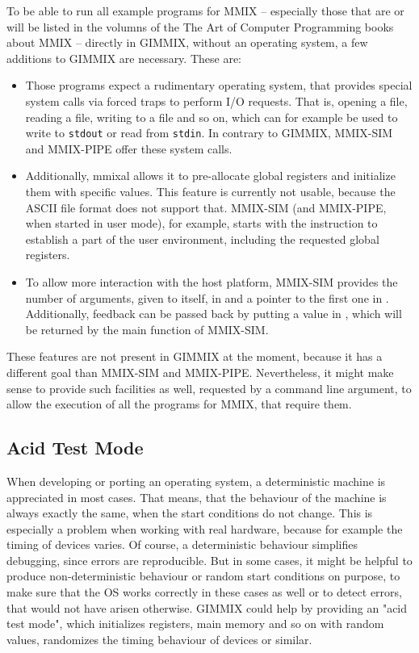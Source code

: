 To be able to run all example programs for MMIX -- especially those that are or will be listed in the volumns of the \gls{The Art of Computer Programming} books about MMIX  -- directly in GIMMIX, \ie without an operating system, a few additions to GIMMIX are necessary. These are:
\begin{itemize}
	\item Those programs expect a rudimentary operating system, that provides special system calls via forced traps to perform I/O requests. That is, opening a file, reading a file, writing to a file and so on, which can for example be used to write to {\tt stdout} or read from {\tt stdin}. In contrary to GIMMIX, MMIX-SIM and MMIX-PIPE offer these system calls.
	\item Additionally, mmixal allows it to pre-allocate global registers and initialize them with specific values. This feature is currently not usable, because the ASCII file format does not support that. MMIX-SIM (and MMIX-PIPE, when started in user mode), for example, starts with the instruction  to establish a part of the user environment, including the requested global registers.
	\item To allow more interaction with the host platform, MMIX-SIM provides the number of arguments, given to itself, in  and a pointer to the first one in . Additionally, feedback can be passed back by putting a value in , which will be returned by the main function of MMIX-SIM.
\end{itemize}
These features are not present in GIMMIX at the moment, because it has a different goal than MMIX-SIM and MMIX-PIPE. Nevertheless, it might make sense to provide such facilities as well, \eg requested by a command line argument, to allow the execution of all the programs for MMIX, that require them.

\subsection{Acid Test Mode}

When developing or porting an operating system, a deterministic machine is appreciated in most cases. That means, that the behaviour of the machine is always exactly the same, when the start conditions do not change. This is especially a problem when working with real hardware, because for example the timing of devices varies. Of course, a deterministic behaviour simplifies debugging, since errors are reproducible. But in some cases, it might be helpful to produce non-deterministic behaviour or random start conditions on purpose, to make sure that the OS works correctly in these cases as well or to detect errors, that would not have arisen otherwise. GIMMIX could help by providing an "acid test mode", which initializes registers, main memory and so on with random values, randomizes the timing behaviour of devices or similar.

